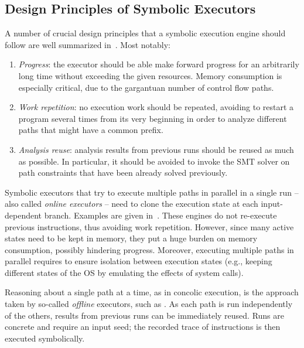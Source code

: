 \subsection{Design Principles of Symbolic Executors}
\label{ss:principles}

A number of crucial design principles that a symbolic execution engine should follow are well summarized in~\cite{MAYHEM-SP12}. Most notably:
\begin{enumerate}
  \item {\em Progress}: the executor should be able make forward progress for an arbitrarily long time without exceeding the given resources. Memory consumption is especially critical, due to the gargantuan number of control flow paths.
  \item {\em Work repetition}: no execution work should be repeated, avoiding to restart a program several times from its very beginning in order to analyze different paths that might have a  common prefix.
  \item {\em Analysis reuse}: analysis results from previous runs should be reused as much as possible. In particular, it should be avoided to invoke the SMT solver on path constraints that have been already solved previously.
\end{enumerate}

\noindent Symbolic executors that try to execute multiple paths in parallel in a single run -- also called {\em online executors} -- need to clone the execution state at each input-dependent branch. Examples are given in~\cite{KLEE-OSDI08,AEG-NDSS11,CKC-TOCS12}. These engines do not re-execute previous instructions, thus avoiding work repetition. However, since many active states need to be kept in memory, they put a huge burden on memory consumption, possibly hindering progress. Moreover, executing multiple paths in parallel requires to ensure isolation between execution states (e.g., keeping different states of the OS by emulating the effects of system calls).

Reasoning about a single path at a time, as in concolic execution, is the approach taken by so-called {\em offline} executors, such as \cite{SAGE-NDSS08}. As each path is run independently of the others, results from previous runs can be immediately reused. Runs are concrete and require an input seed; the recorded trace of instructions is then executed symbolically.

